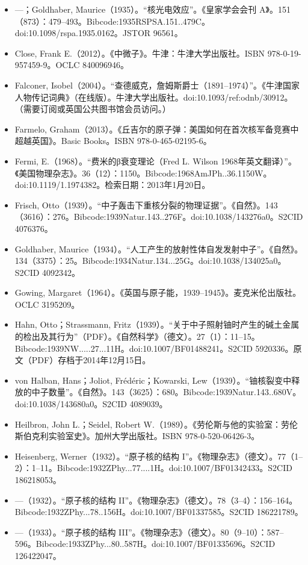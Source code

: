 \begin{itemize}
\item —；Goldhaber, Maurice（1935）。“核光电效应”。《皇家学会会刊 A》。151（873）：479–493。Bibcode:1935RSPSA.151..479C。doi:10.1098/rspa.1935.0162。JSTOR 96561。
\item Close, Frank E.（2012）。《中微子》。牛津：牛津大学出版社。ISBN 978-0-19-957459-9。OCLC 840096946。
\item Falconer, Isobel（2004）。“查德威克，詹姆斯爵士（1891–1974）”。《牛津国家人物传记词典》（在线版）。牛津大学出版社。doi:10.1093/ref:odnb/30912。（需要订阅或英国公共图书馆会员访问。）
\item Farmelo, Graham（2013）。《丘吉尔的原子弹：美国如何在首次核军备竞赛中超越英国》。Basic Books。ISBN 978-0-465-02195-6。
\item Fermi, E.（1968）。“费米的β衰变理论（Fred L. Wilson 1968年英文翻译）”。《美国物理杂志》。36（12）：1150。Bibcode:1968AmJPh..36.1150W。doi:10.1119/1.1974382。检索日期：2013年1月20日。
\item Frisch, Otto（1939）。“中子轰击下重核分裂的物理证据”。《自然》。143（3616）：276。Bibcode:1939Natur.143..276F。doi:10.1038/143276a0。S2CID 4076376。
\item Goldhaber, Maurice（1934）。“人工产生的放射性体自发发射中子”。《自然》。134（3375）：25。Bibcode:1934Natur.134...25G。doi:10.1038/134025a0。S2CID 4092342。
\item Gowing, Margaret（1964）。《英国与原子能，1939–1945》。麦克米伦出版社。OCLC 3195209。
\item Hahn, Otto；Strassmann, Fritz（1939）。“关于中子照射铀时产生的碱土金属的检出及其行为”（PDF）。《自然科学》（德文）。27（1）：11–15。Bibcode:1939NW.....27...11H。doi:10.1007/BF01488241。S2CID 5920336。原文（PDF）存档于2014年12月15日。
\item von Halban, Hans；Joliot, Frédéric；Kowarski, Lew（1939）。“铀核裂变中释放的中子数量”。《自然》。143（3625）：680。Bibcode:1939Natur.143..680V。doi:10.1038/143680a0。S2CID 4089039。
\item Heilbron, John L.；Seidel, Robert W.（1989）。《劳伦斯与他的实验室：劳伦斯伯克利实验室史》。加州大学出版社。ISBN 978-0-520-06426-3。
\item Heisenberg, Werner（1932）。“原子核的结构 I”。《物理杂志》（德文）。77（1–2）：1–11。Bibcode:1932ZPhy...77....1H。doi:10.1007/BF01342433。S2CID 186218053。
\item —（1932）。“原子核的结构 II”。《物理杂志》（德文）。78（3–4）：156–164。Bibcode:1932ZPhy...78..156H。doi:10.1007/BF01337585。S2CID 186221789。
\item —（1933）。“原子核的结构 III”。《物理杂志》（德文）。80（9–10）：587–596。Bibcode:1933ZPhy...80..587H。doi:10.1007/BF01335696。S2CID 126422047。

\end{itemize}

